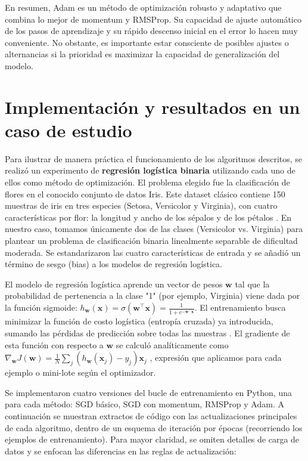 \documentclass[12pt, spanish]{article}
\begin{document}
En resumen, Adam es un método de optimización robusto y adaptativo que combina lo mejor de momentum y RMSProp. Su capacidad de ajuste automático de los pasos de aprendizaje y su rápido descenso inicial en el error lo hacen muy conveniente. No obstante, es importante estar consciente de posibles ajustes o alternancias si la prioridad es maximizar la capacidad de generalización del modelo.

\section{Implementación y resultados en un caso de estudio}
Para ilustrar de manera práctica el funcionamiento de los algoritmos descritos, se realizó un experimento de \textbf{regresión logística binaria} utilizando cada uno de ellos como método de optimización. El problema elegido fue la clasificación de flores en el conocido conjunto de datos Iris. Este dataset clásico contiene 150 muestras de iris en tres especies (Setosa, Versicolor y Virginia), con cuatro características por flor: la longitud y ancho de los sépalos y de los pétalos \cite{ref6}. En nuestro caso, tomamos únicamente dos de las clases (Versicolor vs. Virginia) para plantear un problema de clasificación binaria linealmente separable de dificultad moderada. Se estandarizaron las cuatro características de entrada y se añadió un término de sesgo (bias) a los modelos de regresión logística.

El modelo de regresión logística aprende un vector de pesos $\mathbf{w}$ tal que la probabilidad de pertenencia a la clase "1" (por ejemplo, Virginia) viene dada por la función sigmoide: $h_{\mathbf{w}}(\mathbf{x}) = \sigma(\mathbf{w}^\top \mathbf{x}) = \frac{1}{1 + e^{-\mathbf{w}^\top \mathbf{x}}}$. El entrenamiento busca minimizar la función de costo logística (entropía cruzada) ya introducida, sumando las pérdidas de predicción sobre todas las muestras \cite{ref7}. El gradiente de esta función con respecto a $\mathbf{w}$ se calculó analíticamente como $\nabla_{\mathbf{w}} J(\mathbf{w}) = \frac{1}{N} \sum_j (h_{\mathbf{w}}(\mathbf{x}_j) - y_j) \mathbf{x}_j$ \cite{ref7}, expresión que aplicamos para cada ejemplo o mini-lote según el optimizador.

Se implementaron cuatro versiones del bucle de entrenamiento en Python, una para cada método: SGD básico, SGD con momentum, RMSProp y Adam. A continuación se muestran extractos de código con las actualizaciones principales de cada algoritmo, dentro de un esquema de iteración por épocas (recorriendo los ejemplos de entrenamiento). Para mayor claridad, se omiten detalles de carga de datos y se enfocan las diferencias en las reglas de actualización:
\end{document}
